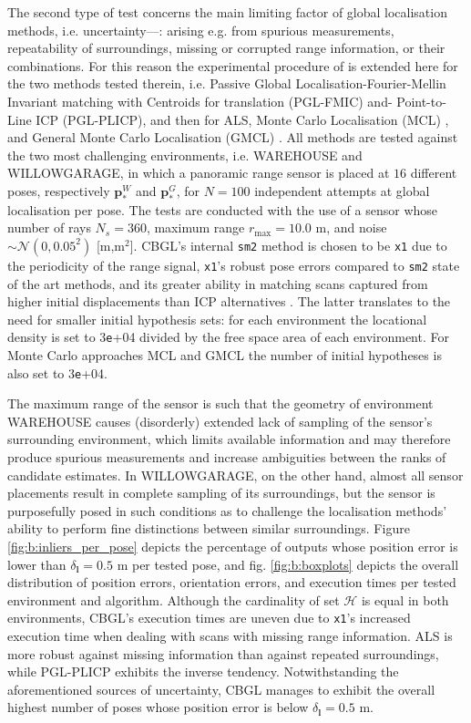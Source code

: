 The second type of test concerns the main limiting factor of global
localisation methods, i.e. uncertainty---: arising e.g. from spurious
measurements, repeatability of surroundings, missing or corrupted range
information, or their combinations. For this reason the experimental procedure
of \cite{Filotheou2022g} is extended here for the two methods tested therein,
i.e. Passive Global Localisation-Fourier-Mellin Invariant matching with
Centroids for translation (PGL-FMIC) and- Point-to-Line ICP (PGL-PLICP), and
then for ALS, Monte Carlo Localisation (MCL) \cite{mcl}, and
General Monte Carlo Localisation (GMCL) \cite{gmcl}. All methods are tested
against the two most challenging environments, i.e.  WAREHOUSE and
WILLOWGARAGE, in which a panoramic range sensor is placed at $16$ different
poses, respectively $\bm{p}_{\ast}^{W}$ and $\bm{p}_{\ast}^{G}$, for $N = 100$
independent attempts at global localisation per pose. The tests are conducted
with the use of a sensor whose number of rays $N_s = 360$, maximum range
$r_{\max} = 10.0$ m, and noise $\sim \mathcal{N}(0, 0.05^2)$ [m,m$^2$].  CBGL's
internal \texttt{sm2} method is chosen to be \texttt{x1} due to the periodicity
of the range signal, \texttt{x1}'s robust pose errors compared to \texttt{sm2}
state of the art methods, and its greater ability in matching scans captured
from higher initial displacements than ICP alternatives \cite{Filotheou2023a}.
The latter translates to the need for smaller initial hypothesis sets: for each
environment the locational density is set to $3$\texttt{e}+04 divided by the
free space area of each environment. For Monte Carlo approaches MCL and GMCL
the number of initial hypotheses is also set to $3$\texttt{e}+04.

The maximum range of the sensor is such that the geometry of environment
WAREHOUSE causes (disorderly) extended lack of sampling of the sensor's
surrounding environment, which limits available information and may therefore
produce spurious measurements and increase ambiguities between the ranks of
candidate estimates. In WILLOWGARAGE, on the other hand, almost all sensor
placements result in complete sampling of its surroundings, but the sensor is
purposefully posed in such conditions as to challenge the localisation methods'
ability to perform fine distinctions between similar surroundings. Figure
\ref{fig:b:inliers_per_pose} depicts the percentage of outputs whose position
error is lower than $\delta_{\bm{l}} = 0.5$ m per tested pose, and fig.
\ref{fig:b:boxplots} depicts the overall distribution of position errors,
orientation errors, and execution times per tested environment and algorithm.
Although the cardinality of set $\mathcal{H}$ is equal in both environments,
CBGL's execution times are uneven due to \texttt{x1}'s increased execution time
when dealing with scans with missing range information. ALS is more robust
against missing information than against repeated surroundings, while PGL-PLICP
exhibits the inverse tendency. Notwithstanding the aforementioned sources of
uncertainty, CBGL manages to exhibit the overall highest number of poses whose
position error is below $\delta_{\bm{l}} = 0.5$ m.

